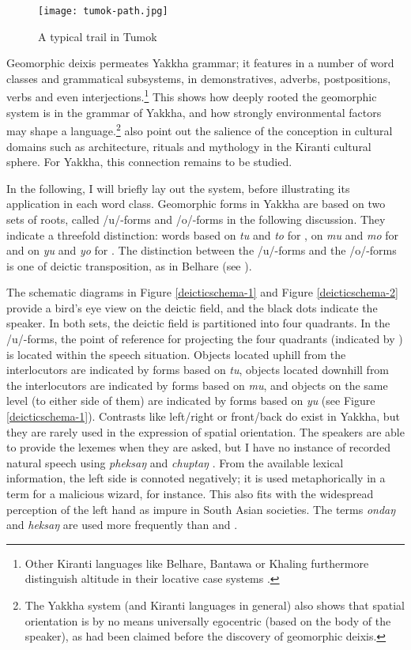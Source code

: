 \begin{figure}
\centering
\texttt{[image: tumok-path.jpg]}
\caption{A typical trail in Tumok}\label{tumok-path}
\end{figure}

Geomorphic deixis permeates Yakkha grammar;  it features in a number of word classes and grammatical subsystems, in demonstratives, adverbs, postpositions,  verbs and even interjections.\footnote{Other Kiranti languages like Belhare, Bantawa or Khaling furthermore distinguish altitude in their locative case systems \citep{Ebert1994The-structure, Bickel1997Spatial}.} This shows how deeply rooted the geomorphic system is in the grammar of Yakkha, and how strongly environmental factors may shape a language.\footnote{The Yakkha system (and Kiranti languages in general) also shows that spatial orientation is by no means universally egocentric (based on the body of the speaker), as had been claimed before the discovery of geomorphic deixis.} \citet{Bickeletal1999Cultural} also point out the salience of the  conception in cultural domains such as architecture, rituals and mythology in the Kiranti cultural sphere. For Yakkha, this connection remains to be studied.

In the following, I will briefly lay out the system, before illustrating its application in each word class. Geomorphic forms in Yakkha are based on two sets of roots, called /u/-forms and /o/-forms in the following discussion. They indicate  a threefold distinction: words based on \emph{tu} and \emph{to} for , on \emph{mu} and \emph{mo} for  and on \emph{yu} and \emph{yo} for . The distinction between the /u/-forms and the /o/-forms is one of deictic transposition, as in Belhare (see \citealt{Bickel1997Spatial, Bickel2001Deictic}). 

The schematic diagrams in Figure \ref{deicticschema-1} and Figure \ref{deicticschema-2} provide a bird's eye view on the deictic field, and the black dots indicate the speaker. In both sets, the deictic field is partitioned into four quadrants. In the /u/-forms, the point of reference  for projecting the four quadrants (indicated by ) is located within the speech situation. Objects located uphill from the interlocutors are indicated by forms based on \emph{tu}, objects located downhill  from the interlocutors are indicated by forms based on  \emph{mu}, and objects on the same level (to either side of them) are indicated by forms based on \emph{yu} (see Figure \ref{deicticschema-1}). Contrasts like left/right or front/back do exist in Yakkha, but they are rarely used in the expression of spatial orientation. The speakers are able to provide the lexemes when they are asked, but I have no instance of recorded natural speech using \emph{pheksaŋ}  and \emph{chuptaŋ} . From the available lexical information, the left side is connoted negatively; it is used metaphorically in a term for a malicious wizard, for instance. This also  fits with the widespread perception of the left hand as impure in South Asian societies. The terms \emph{ondaŋ}  and \emph{heksaŋ}  are used more frequently than  and . 


